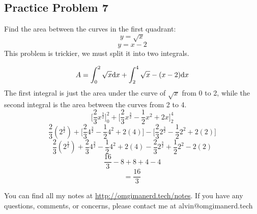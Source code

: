 \documentclass{math}
\begin{document}
\subsection*{Practice Problem 7}
Find the area between the curves in the first quadrant:
\[ y = \sqrt{x} \]
\[ y = x-2 \]
This problem is trickier, we must split it into two integrals.
\begin{center}
\end{center}
\[ A = \int_{0}^{2}{\sqrt{x}\mathrm{d}{x}}+\int_{2}^{4}{\sqrt{x}-(x-2)\mathrm{d}{x}} \]
The first integral is just the area under the curve of \( \sqrt{x} \) from 0 to
2, while the second integral is the area between the curves from 2 to 4.
\[ \bigg[\frac{2}{3}x^{\frac{3}{2}}\bigg]_{0}^{2}+
   \bigg[\frac{2}{3}x^{\frac{3}{2}}-\frac{1}{2}x^{2}+2x\bigg]_{2}^{4} \]
\[ \frac{2}{3}(2^{\frac{3}{2}})+
   \bigg[\frac{2}{3}4^{\frac{3}{2}}-\frac{1}{2}4^{2}+2(4)\bigg]-
   \bigg[\frac{2}{3}2^{\frac{3}{2}}-\frac{1}{2}2^{2}+2(2)\bigg] \]
\[ \frac{2}{3}(2^{\frac{3}{2}})+
   \frac{2}{3}4^{\frac{3}{2}}-\frac{1}{2}4^{2}+2(4)-
   \frac{2}{3}2^{\frac{3}{2}}+\frac{1}{2}2^{2}-2(2) \]
\[ \frac{16}{3}-8+8+4-4 \]
\[  = \frac{16}{3} \]

\begin{center}
  You can find all my notes at \url{http://omgimanerd.tech/notes}. If you have
  any questions, comments, or concerns, please contact me at
  alvin@omgimanerd.tech
\end{center}
\end{document}
